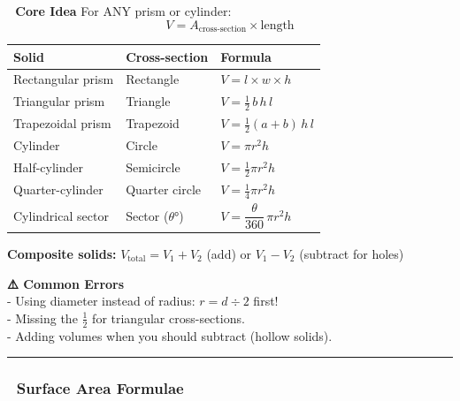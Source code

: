 \documentclass[
  letterpaper,
  DIV=11,
  numbers=noendperiod]{scrreprt}
\theoremstyle{definition}
\theoremstyle{remark}
\begin{document}
\textbf{🎯 Core Idea} For ANY prism or cylinder:\\
\[V = A_{\text{cross-section}} \times \text{length}\]

\begin{longtable}[]{@{}
  >{\raggedright\arraybackslash}p{}
  >{\raggedright\arraybackslash}p{}
  >{\raggedright\arraybackslash}p{}@{}}
\toprule\noalign{}
\begin{minipage}[b]{\linewidth}\raggedright
Solid
\end{minipage} & \begin{minipage}[b]{\linewidth}\raggedright
Cross-section
\end{minipage} & \begin{minipage}[b]{\linewidth}\raggedright
Formula
\end{minipage} \\
\midrule\noalign{}
\endhead
\bottomrule\noalign{}
\endlastfoot
Rectangular prism & Rectangle & \(V = l \times w \times h\) \\
Triangular prism & Triangle & \(V = \tfrac{1}{2}\,b\,h\,l\) \\
Trapezoidal prism & Trapezoid & \(V = \tfrac{1}{2}(a+b)\,h\,l\) \\
Cylinder & Circle & \(V = \pi r^2 h\) \\
Half-cylinder & Semicircle & \(V = \tfrac{1}{2}\pi r^2 h\) \\
Quarter-cylinder & Quarter circle & \(V = \tfrac{1}{4}\pi r^2 h\) \\
Cylindrical sector & Sector (\(\theta°\)) &
\(V = \dfrac{\theta}{360}\,\pi r^2 h\) \\
\end{longtable}

\textbf{Composite solids:} \(V_{\text{total}} = V_1 + V_2\) (add) or
\(V_1 - V_2\) (subtract for holes)

\textbf{⚠️ Common Errors}\\
- Using diameter instead of radius: \(r = d \div 2\) first!\\
- Missing the \(\tfrac{1}{2}\) for triangular cross-sections.\\
- Adding volumes when you should subtract (hollow solids).

\begin{center}\rule{0.5\linewidth}{0.5pt}\end{center}

\subsubsection*{🎨 Surface Area Formulae}\label{surface-area-formulae}
\end{document}
